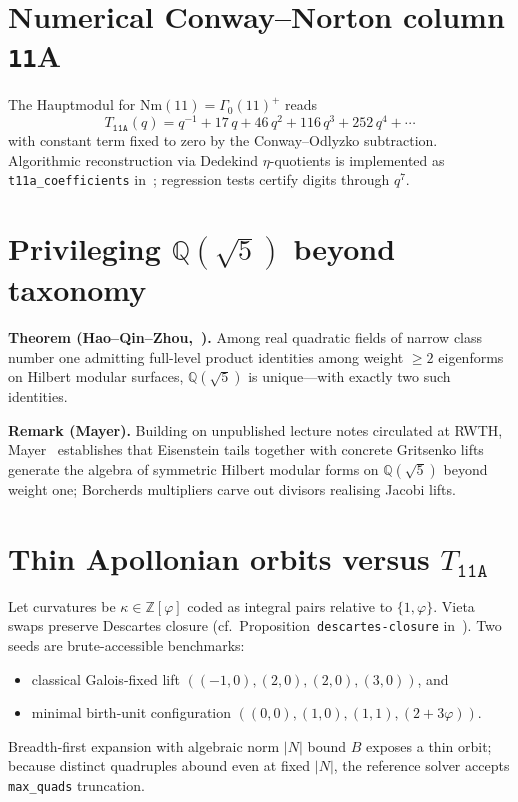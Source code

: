 \documentclass[11pt,a4paper]{article}
\theoremstyle{plain}
\theoremstyle{definition}
\theoremstyle{remark}
\numberwithin{equation}{section}
\providecommand{\Zp}{\ensuremath{\mathbb{Z}[\varphi]}}
\providecommand{\Qp}{\ensuremath{\mathbb{Q}(\sqrt{5})}}
\begin{document}
\section{Numerical Conway--Norton column \texttt{11}A}
The Hauptmodul for $\mathrm{Nm}(11)=\Gamma_{0}(11)^{+}$ reads
\[T_{\texttt{11A}}(q)=q^{-1}+17\,q+46\,q^{2}+116\,q^{3}+252\,q^{4}+\cdots\]
with constant term fixed to zero by the Conway--Odlyzko subtraction.
Algorithmic reconstruction via Dedekind $\eta$-quotients is implemented as
\texttt{t11a\_coefficients} in~\cite{moonshine-py}; regression tests certify
digits through $q^{7}$.

\section{Privileging $\Qp$ beyond taxonomy}
\textbf{Theorem (Hao--Qin--Zhou,~\cite{HQZ}).}
Among real quadratic fields of narrow class number one admitting full-level
product identities among weight $\ge 2$ eigenforms on Hilbert modular
surfaces, $\Qp$ is unique---with exactly two such identities.

\textbf{Remark (Mayer).}
Building on unpublished lecture notes circulated at RWTH,
Mayer~\cite{MayerDiss} establishes that Eisenstein tails together with concrete
Gritsenko lifts generate the algebra of symmetric Hilbert modular forms on
$\Qp$ beyond weight one; Borcherds multipliers carve out divisors realising
Jacobi lifts.

\section{Thin Apollonian orbits versus $T_{\texttt{11A}}$}
\label{sec:falsifier}
Let curvatures be $\kappa\in\Zp$ coded as integral pairs relative to $\{1,\varphi\}$.
Vieta swaps preserve Descartes closure (cf.\ Proposition~\texttt{descartes-closure}
in~\cite{golden-tetrad}). Two seeds are brute-accessible benchmarks:
\begin{itemize}
\item classical Galois-fixed lift $((-1,0),(2,0),(2,0),(3,0))$, and
\item minimal birth-unit configuration $((0,0),(1,0),(1,1),(2{+}3\varphi))$.
\end{itemize}
Breadth-first expansion with algebraic norm $|N|$ bound $B$ exposes a thin
orbit; because distinct quadruples abound even at fixed $|N|$, the reference
solver accepts \texttt{max\_quads} truncation.
\end{document}
